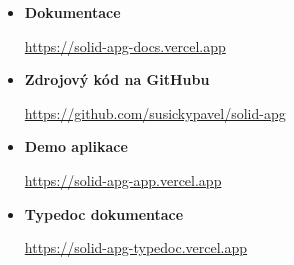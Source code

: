 \begin{itemize}
    \item \textbf{Dokumentace}

          \url{https://solid-apg-docs.vercel.app}

    \item \textbf{Zdrojový kód na GitHubu}

          \url{https://github.com/susickypavel/solid-apg}
    \item \textbf{Demo aplikace}

          \url{https://solid-apg-app.vercel.app}

    \item \textbf{Typedoc dokumentace}

          \url{https://solid-apg-typedoc.vercel.app}
\end{itemize}

